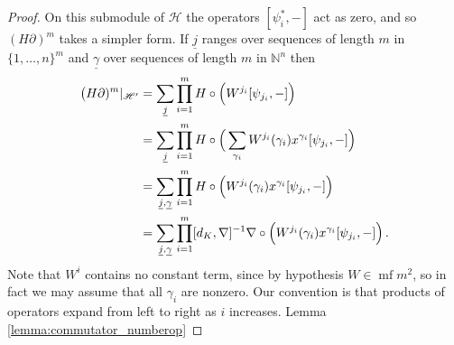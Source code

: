 \documentclass[english,letter paper,12pt,leqno]{article}
\theoremstyle{example}
\numberwithin{equation}{section}
\DeclareMathOperator{\mf}{mf}
\begin{document}
\begin{proof}
On this submodule of $\mathscr{H}$ the operators $[\psi_i^*,-]$ act as zero, and so $(H \partial)^m$ takes a simpler form. If $\underline{j}$ ranges over sequences of length $m$ in $\{1,\ldots,n\}^m$ and $\underline{\gamma}$ over sequences of length $m$ in $\mathbb{N}^n$ then
\begin{align*}
\big( H \partial )^m \arrowvert_{\mathscr{H}'} &= \sum_{\underline{j}} \prod_{i=1}^m H \circ \Big( W^{j_i} [ \psi_{j_i}, - ] \Big)\\
&= \sum_{\underline{j}} \prod_{i=1}^m H \circ \Big( \sum_{\gamma_i} W^{j_i}(\gamma_i) x^{\gamma_i} [ \psi_{j_i}, - ] \Big)\\
&= \sum_{\underline{j}, \underline{\gamma}} \prod_{i=1}^m H \circ \Big( W^{j_i}(\gamma_i) x^{\gamma_i} [ \psi_{j_i}, - ] \Big)\\
&= \sum_{\underline{j}, \underline{\gamma}} \prod_{i=1}^m [d_K, \nabla]^{-1} \nabla \circ \Big( W^{j_i}(\gamma_i) x^{\gamma_i} [ \psi_{j_i}, - ] \Big)\,.
\end{align*}
Note that $W^i$ contains no constant term, since by hypothesis $W \in \mf{m}^2$, so in fact we may assume that all $\gamma_i$ are nonzero. Our convention is that products of operators expand from left to right as $i$ increases. Lemma \ref{lemma:commutator_numberop}


\end{proof}
\end{document}
